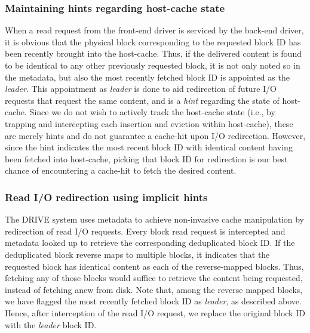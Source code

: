 \subsubsection{Maintaining hints regarding host-cache state}
When a read request from the front-end driver is serviced by the back-end
driver, it is obvious that the physical block
corresponding to the requested
block ID has been recently brought into the host-cache. Thus, if the delivered
content is found to be identical to any other previously requested block, it 
is not only noted 
so in the metadata, but also the most recently fetched block ID is appointed
as the \textit{leader}. This appointment as \textit{leader} is done to aid
redirection of future I/O requests that request the same content, and is
a \textit{hint} regarding the state of host-cache.
Since we do not wish to actively track the host-cache state (i.e., by
trapping and intercepting each insertion and eviction within host-cache), 
these are merely hints and do not guarantee a cache-hit upon I/O redirection.
However, since the hint indicates the most recent block ID with identical
content having been fetched into host-cache, picking that block ID for 
redirection is our best chance of encountering a cache-hit to fetch the 
desired content. 



\subsubsection{Read I/O redirection using implicit hints}
The DRIVE system uses metadata to achieve non-invasive
cache manipulation by redirection of read I/O requests. Every block read
request is intercepted and metadata looked up to retrieve the corresponding
deduplicated block ID. If the
deduplicated block reverse maps to multiple blocks, it indicates that the 
requested block has identical content as each of the reverse-mapped blocks.
Thus, fetching any of those blocks would suffice to retrieve the content 
being requested, instead of fetching anew from disk. Note that, among the 
reverse mapped blocks, we have flagged the most recently fetched block ID as 
\textit{leader}, as described above. Hence, after interception of the read 
I/O request, we replace the original block ID with the \textit{leader} block ID.

